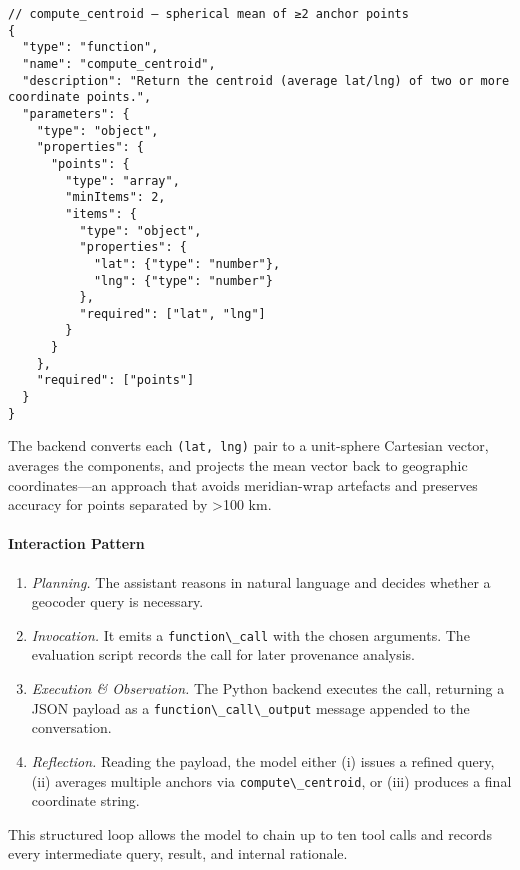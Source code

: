 \begin{lstlisting}
// compute_centroid – spherical mean of ≥2 anchor points
{
  "type": "function",
  "name": "compute_centroid",
  "description": "Return the centroid (average lat/lng) of two or more coordinate points.",
  "parameters": {
    "type": "object",
    "properties": {
      "points": {
        "type": "array",
        "minItems": 2,
        "items": {
          "type": "object",
          "properties": {
            "lat": {"type": "number"},
            "lng": {"type": "number"}
          },
          "required": ["lat", "lng"]
        }
      }
    },
    "required": ["points"]
  }
}
\end{lstlisting}

The backend converts each \passthrough{\lstinline!(lat, lng)!} pair to a
unit-sphere Cartesian vector, averages the components, and projects the
mean vector back to geographic coordinates---an approach that avoids
meridian-wrap artefacts and preserves accuracy for points separated by
\textgreater100 km.

\paragraph{Interaction Pattern}\label{interaction-pattern}

\begin{enumerate}
\def\labelenumi{\arabic{enumi}.}
\tightlist
\item
  \emph{Planning.} The assistant reasons in natural language and decides
  whether a geocoder query is necessary.
\item
  \emph{Invocation.} It emits a \passthrough{\lstinline!function\_call!}
  with the chosen arguments. The evaluation script records the call for
  later provenance analysis.
\item
  \emph{Execution \& Observation.} The Python backend executes the call,
  returning a JSON payload as a
  \passthrough{\lstinline!function\_call\_output!} message appended to
  the conversation.
\item
  \emph{Reflection.} Reading the payload, the model either (i) issues a
  refined query, (ii) averages multiple anchors via
  \passthrough{\lstinline!compute\_centroid!}, or (iii) produces a final
  coordinate string.
\end{enumerate}

This structured loop allows the model to chain up to ten tool calls and
records every intermediate query, result, and internal rationale.

